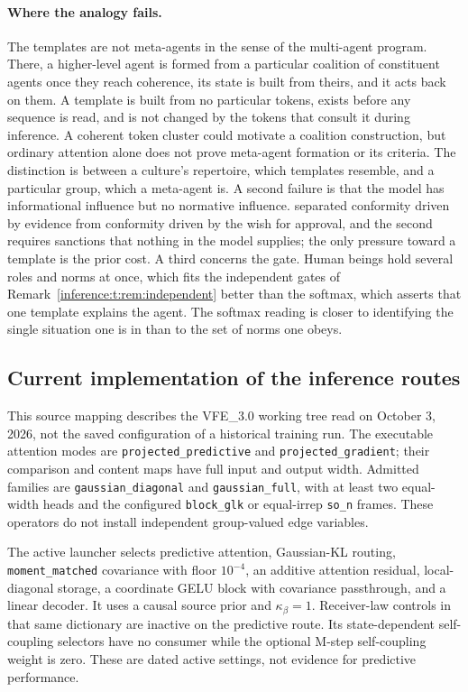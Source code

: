 \documentclass[11pt]{article}
\theoremstyle{definition}
\theoremstyle{remark}
\providecommand{\cfg}[1]{{\small\texttt{#1}}}
\begin{document}
\paragraph{Where the analogy fails.}
The templates are not meta-agents in the sense of the multi-agent program. There, a higher-level agent is formed from a particular coalition of constituent agents once they reach coherence, its state is built from theirs, and it acts back on them. A template is built from no particular tokens, exists before any sequence is read, and is not changed by the tokens that consult it during inference. A coherent token cluster could motivate a coalition construction, but ordinary attention alone does not prove meta-agent formation or its criteria. The distinction is between a culture's repertoire, which templates resemble, and a particular group, which a meta-agent is. A second failure is that the model has informational influence but no normative influence. \citep{inference:deutsch1955} separated conformity driven by evidence from conformity driven by the wish for approval, and the second requires sanctions that nothing in the model supplies; the only pressure toward a template is the prior cost. A third concerns the gate. Human beings hold several roles and norms at once, which fits the independent gates of Remark~\ref{inference:t:rem:independent} better than the softmax, which asserts that one template explains the agent. The softmax reading is closer to identifying the single situation one is in than to the set of norms one obeys.

\subsection{Current implementation of the inference routes}
\label{inference:implementation}
This source mapping describes the VFE\_3.0 working tree read on October 3, 2026, not the saved configuration of a historical training run. The executable attention modes are \cfg{projected\_predictive} and \cfg{projected\_gradient}; their comparison and content maps have full input and output width. Admitted families are \cfg{gaussian\_diagonal} and \cfg{gaussian\_full}, with at least two equal-width heads and the configured \cfg{block\_glk} or equal-irrep \cfg{so\_n} frames. These operators do not install independent group-valued edge variables.

The active launcher selects predictive attention, Gaussian-KL routing, \cfg{moment\_matched} covariance with floor $10^{-4}$, an additive attention residual, local-diagonal storage, a coordinate GELU block with covariance passthrough, and a linear decoder. It uses a causal source prior and $\kappa_\beta=1$. Receiver-law controls in that same dictionary are inactive on the predictive route. Its state-dependent self-coupling selectors have no consumer while the optional M-step self-coupling weight is zero. These are dated active settings, not evidence for predictive performance.
\end{document}
